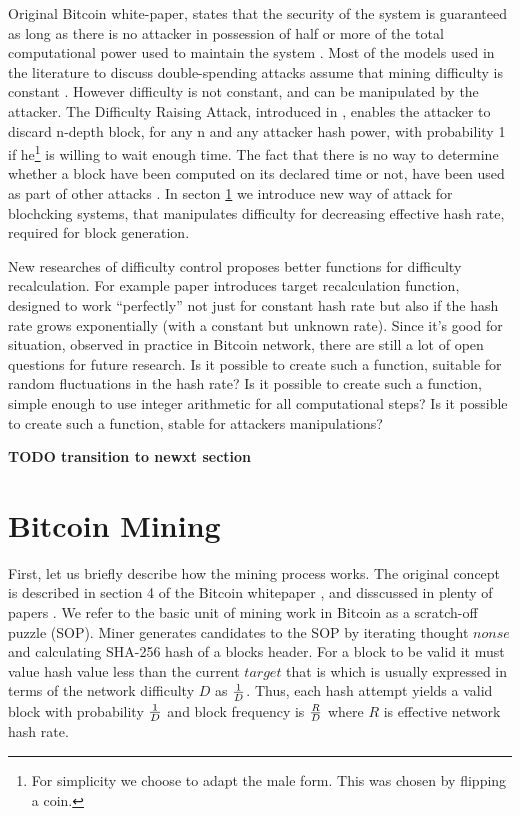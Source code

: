 \documentclass[number,preprint,review]{elsarticle}
\begin{document}
Original Bitcoin white-paper, states that the security of the system is guaranteed as long as there is no attacker in possession of half or more of the total computational power used to maintain the system \cite{Nakamoto2008}.
Most of the models used in the literature to discuss double-spending attacks assume that mining difficulty is constant \cite{??}.
However difficulty is not constant, and can be manipulated by the attacker.
The Difficulty Raising Attack, introduced in \cite{bahack2013theoretical}, enables the attacker to discard n-depth block, for any n and any attacker hash power, with probability 1 if he\footnote{For simplicity we choose to adapt the male form. This was chosen by flipping a coin.} is willing to wait enough time.
The fact that there is no way to determine whether a block have been computed on its declared time or not, have been used as part of other attacks \cite{timejacking2011, artforz2011}.
In secton \ref{sec:bit} we introduce new way of attack for blochcking systems, that manipulates difficulty for decreasing effective hash rate, required for block generation.

New researches of difficulty control proposes better functions for difficulty recalculation.
For example paper \cite{kraft2015difficulty} introduces target recalculation function, designed to work “perfectly” not just for constant hash rate but also if the hash rate grows exponentially (with a constant but unknown rate).
Since it's good for situation, observed in practice in Bitcoin network, there are still a lot of open questions for future research.
Is it possible to create such a function, suitable for random fluctuations in the hash rate?
Is it possible to create such a function, simple enough to use integer arithmetic for all computational steps?
Is it possible to create such a function, stable for attackers manipulations?

\textbf{TODO transition to newxt section}

\section{Bitcoin Mining}
\label{sec:bit}

First, let us briefly describe how the mining process works.
The original concept is described in section 4 of the Bitcoin whitepaper \cite{Nakamoto2008}, and disscussed in plenty of papers \cite{kraft2015difficulty, miller2014permacoin, eyal2014majority}.
We refer to the basic unit of mining work in Bitcoin as a scratch-off puzzle (SOP).
Miner generates candidates to the SOP by iterating thought \(nonse\) and calculating SHA-256 hash of a blocks header.
For a block to be valid it must value hash value less than the current \(target\) that is which is usually expressed in terms of the network difficulty \(D\) as \(1\over D\).
Thus, each hash attempt yields a valid block with probability \(1\over D\) and block frequency is \(R\over D\) where \(R\) is effective network hash rate.
\end{document}
